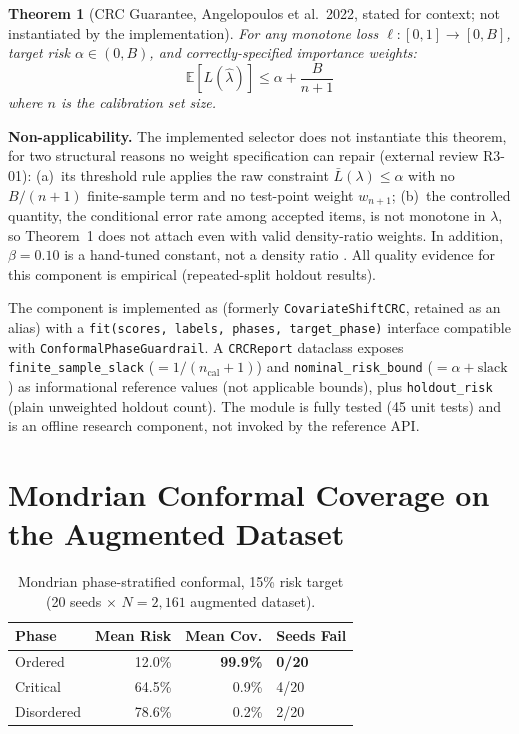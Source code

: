 \documentclass[10pt,twocolumn]{article}
\newtheorem{theorem}{Theorem}
\begin{document}
\begin{theorem}[CRC Guarantee, Angelopoulos et al.\ 2022, stated for
context; not instantiated by the implementation]
For any monotone loss $\ell : [0,1] \to [0,B]$, target risk
$\alpha \in (0,B)$, and correctly-specified importance weights:
\[
  \mathbb{E}[L(\hat{\lambda})] \leq \alpha + \frac{B}{n+1}
\]
where $n$ is the calibration set size.
\end{theorem}

\textbf{Non-applicability.} The implemented selector does not
instantiate this theorem, for two structural reasons no weight
specification can repair (external review R3-01): (a)~its threshold
rule applies the raw constraint $\bar{L}(\lambda) \leq \alpha$ with no
$B/(n+1)$ finite-sample term and no test-point weight $w_{n+1}$;
(b)~the controlled quantity, the conditional error rate among
accepted items, is not monotone in $\lambda$, so Theorem~1 does not
attach even with valid density-ratio weights. In addition,
$\beta = 0.10$ is a hand-tuned constant, not a density ratio
\cite{tibshirani2019conformal}. All quality evidence for this component is
empirical (repeated-split holdout results).

The component is implemented as
(formerly \texttt{CovariateShiftCRC}, retained as an alias) with a
\texttt{fit(scores, labels, phases, target\_phase)} interface
compatible with \texttt{ConformalPhaseGuardrail}.  A \texttt{CRCReport}
dataclass exposes \texttt{finite\_sample\_slack} ($= 1/(n_{\text{cal}}+1)$)
and \texttt{nominal\_risk\_bound} ($= \alpha + \text{slack}$) as
informational reference values (not applicable bounds), plus
\texttt{holdout\_risk} (plain unweighted holdout count). The module is
fully tested (45 unit tests) and is an
offline research component, not invoked by the reference API.



\section{Mondrian Conformal Coverage on the Augmented Dataset}
\label{app:mondrian}

\begin{table}[h]
\centering\small
\caption{Mondrian phase-stratified conformal, 15\% risk target
(20 seeds $\times$ $N=2{,}161$ augmented dataset).}
\begin{tabular}{@{}lrrl@{}}
\toprule
Phase & Mean Risk & Mean Cov. & Seeds Fail \\
\midrule
Ordered    & 12.0\% & \textbf{99.9\%} & \textbf{0/20} \\
Critical   & 64.5\% &  0.9\% & 4/20 \\
Disordered & 78.6\% &  0.2\% & 2/20 \\
\bottomrule
\end{tabular}
\label{tab:mondrian}
\end{table}
\end{document}

